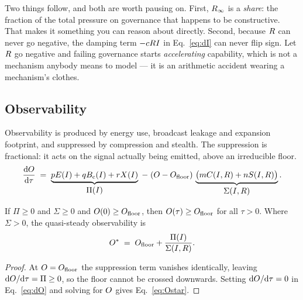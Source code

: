 Two things follow, and both are worth pausing on. First, $R_\infty$ is a
\emph{share}: the fraction of the total pressure on governance that happens to
be constructive. That makes it something you can reason about directly. Second,
because $R$ can never go negative, the damping term $-cRI$ in
Eq.~\eqref{eq:dI} can never flip sign. Let $R$ go negative and failing
governance starts \emph{accelerating} capability, which is not a mechanism
anybody means to model --- it is an arithmetic accident wearing a mechanism's
clothes.

\subsection{Observability}

Observability is produced by energy use, broadcast leakage and expansion
footprint, and suppressed by compression and stealth. The suppression is
fractional: it acts on the signal actually being emitted, above an irreducible
floor.
\begin{equation}
  \frac{\mathrm{d}O}{\mathrm{d}\tau} \;=\; \underbrace{p E(I) + q B_{\mathrm c}(I) + r X(I)}_{\textstyle \Pi(I)}
  \;-\; (O - O_{\mathrm{floor}})\,\underbrace{\big(m C(I,R) + n S(I,R)\big)}_{\textstyle \Sigma(I,R)} .
  \label{eq:dO}
\end{equation}

\begin{proposition}
\label{prop:obs}
If $\Pi \geq 0$ and $\Sigma \geq 0$ and $O(0) \geq O_{\mathrm{floor}}$, then
$O(\tau) \geq O_{\mathrm{floor}}$ for all $\tau > 0$. Where $\Sigma > 0$, the
quasi-steady observability is
\begin{equation}
  O^{*} \;=\; O_{\mathrm{floor}} + \frac{\Pi(I)}{\Sigma(I,R)} .
  \label{eq:Ostar}
\end{equation}
\end{proposition}

\begin{proof}
At $O = O_{\mathrm{floor}}$ the suppression term vanishes identically, leaving
$\mathrm{d}O/\mathrm{d}\tau = \Pi \geq 0$, so the floor cannot be crossed
downwards. Setting $\mathrm{d}O/\mathrm{d}\tau = 0$ in Eq.~\eqref{eq:dO} and
solving for $O$ gives Eq.~\eqref{eq:Ostar}.
\end{proof}


